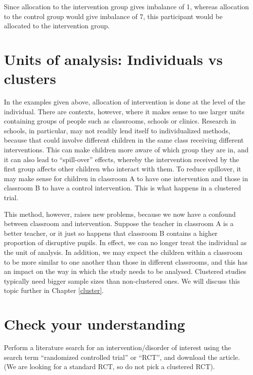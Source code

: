 \documentclass{krantz}
\begin{document}
Since allocation to the intervention group gives imbalance of 1, whereas allocation to the control group would give imbalance of 7, this participant would be allocated to the intervention group.

\hypertarget{units-of-analysis-individuals-vs-clusters}{%
\section{Units of analysis: Individuals vs clusters}\label{units-of-analysis-individuals-vs-clusters}}

In the examples given above, allocation of intervention is done at the level of the individual. There are contexts, however, where it makes sense to use larger units containing groups of people such as classrooms, schools or clinics. Research in schools, in particular, may not readily lend itself to individualized methods, because that could involve different children in the same class receiving different interventions. This can make children more aware of which group they are in, and it can also lead to ``spill-over'' effects, whereby the intervention received by the first group affects other children who interact with them. To reduce spillover, it may make sense for children in classroom A to have one intervention and those in classroom B to have a control intervention. This is what happens in a clustered trial.

This method, however, raises new problems, because we now have a confound between classroom and intervention. Suppose the teacher in classroom A is a better teacher, or it just so happens that classroom B contains a higher proportion of disruptive pupils. In effect, we can no longer treat the individual as the unit of analysis. In addition, we may expect the children within a classroom to be more similar to one another than those in different classrooms, and this has an impact on the way in which the study needs to be analysed. Clustered studies typically need bigger sample sizes than non-clustered ones. We will discuss this topic further in Chapter \ref{cluster}.

\hypertarget{check-your-understanding-6}{%
\section{Check your understanding}\label{check-your-understanding-6}}

Perform a literature search for an intervention/disorder of interest using the search term ``randomized controlled trial'' or ``RCT'', and download the article. (We are looking for a standard RCT, so do not pick a clustered RCT).
\end{document}
